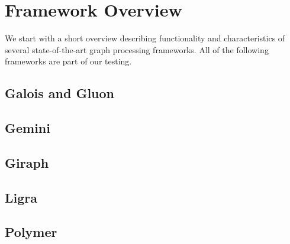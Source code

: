 
\section{Framework Overview}
We start with a short overview describing functionality and characteristics of several state-of-the-art graph processing frameworks.
All of the following frameworks are part of our testing.
\todo

\subsection{Galois and Gluon}


\subsection{Gemini}


\subsection{Giraph}


\subsection{Ligra}


\subsection{Polymer}





